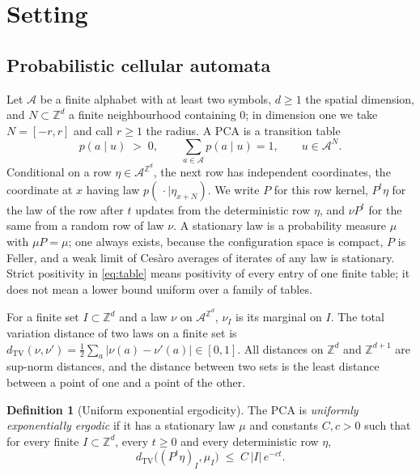 \documentclass[11pt]{article}
\theoremstyle{plain}
\theoremstyle{definition}
\newtheorem{definition}[theorem]{Definition}
\theoremstyle{remark}
\newcommand{\A}{\mathcal{A}}
\newcommand{\Z}{\mathbb{Z}}
\newcommand{\dtv}{d_{\mathrm{TV}}}
\begin{document}
\section{Setting}
\label{sec:setting}

\subsection{Probabilistic cellular automata}

Let $\A$ be a finite alphabet with at least two symbols, $d\ge1$ the spatial dimension, and $N\subset\Z^d$ a finite neighbourhood containing $0$; in dimension one we take $N=[-r,r]$ and call $r\ge1$ the radius. A PCA is a transition table
\begin{equation}
p(a\mid u)\;>\;0,\qquad \sum_{a\in\A}p(a\mid u)=1,\qquad u\in\A^{N}.
\label{eq:table}
\end{equation}
Conditional on a row $\eta\in\A^{\Z^d}$, the next row has independent coordinates, the coordinate at $x$ having law $p(\,\cdot\mid\eta_{x+N})$. We write $P$ for this row kernel, $P^t\eta$ for the law of the row after $t$ updates from the deterministic row $\eta$, and $\nu P^t$ for the same from a random row of law $\nu$. A stationary law is a probability measure $\mu$ with $\mu P=\mu$; one always exists, because the configuration space is compact, $P$ is Feller, and a weak limit of Ces\`aro averages of iterates of any law is stationary. Strict positivity in \eqref{eq:table} means positivity of every entry of one finite table; it does not mean a lower bound uniform over a family of tables.

For a finite set $I\subset\Z^d$ and a law $\nu$ on $\A^{\Z^d}$, $\nu_I$ is its marginal on $I$. The total variation distance of two laws on a finite set is $\dtv(\nu,\nu')=\tfrac12\sum_a|\nu(a)-\nu'(a)|\in[0,1]$. All distances on $\Z^d$ and $\Z^{d+1}$ are sup-norm distances, and the distance between two sets is the least distance between a point of one and a point of the other.

\begin{definition}[Uniform exponential ergodicity]
\label{def:uee}
The PCA is \emph{uniformly exponentially ergodic} if it has a stationary law $\mu$ and constants $C,c>0$ such that for every finite $I\subset\Z^d$, every $t\ge0$ and every deterministic row $\eta$,
\begin{equation}
\dtv\bigl((P^t\eta)_I,\mu_I\bigr)\;\le\;C\,|I|\,e^{-ct}.
\label{eq:uee}
\end{equation}
\end{definition}
\end{document}
